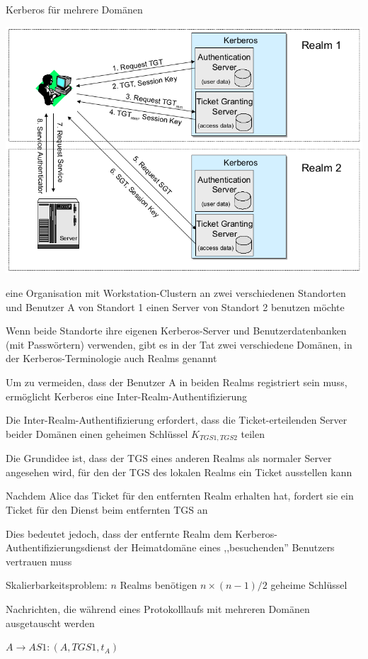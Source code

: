 \documentclass[a4paper]{article}
\begin{document}
\begin{multicols}{3}
      Kerberos für mehrere Domänen
      \begin{center}
            \includegraphics[width=.4\linewidth]{Assets/NetworkSecurity-multi-domain-kerberos.png}
      \end{center}
      \begin{itemize*}
            \item eine Organisation mit Workstation-Clustern an zwei verschiedenen Standorten und Benutzer A von Standort 1 einen Server von Standort 2 benutzen möchte
            \item Wenn beide Standorte ihre eigenen Kerberos-Server und Benutzerdatenbanken (mit Passwörtern) verwenden, gibt es in der Tat zwei verschiedene Domänen, in der Kerberos-Terminologie auch Realms genannt
            \item Um zu vermeiden, dass der Benutzer A in beiden Realms registriert sein muss, ermöglicht Kerberos eine Inter-Realm-Authentifizierung
            \item Die Inter-Realm-Authentifizierung erfordert, dass die Ticket-erteilenden Server beider Domänen einen geheimen Schlüssel $K_{TGS1,TGS2}$ teilen
            \item Die Grundidee ist, dass der TGS eines anderen Realms als normaler Server angesehen wird, für den der TGS des lokalen Realms ein Ticket ausstellen kann
            \item Nachdem Alice das Ticket für den entfernten Realm erhalten hat, fordert sie ein Ticket für den Dienst beim entfernten TGS an
            \item Dies bedeutet jedoch, dass der entfernte Realm dem Kerberos-Authentifizierungsdienst der Heimatdomäne eines ,,besuchenden'' Benutzers vertrauen muss
            \item Skalierbarkeitsproblem: $n$ Realms benötigen $n\times(n-1)/2$ geheime Schlüssel
            \item Nachrichten, die während eines Protokolllaufs mit mehreren Domänen ausgetauscht werden
      \end{itemize*}
      \begin{enumerate*}
            \item $A\rightarrow AS1:(A,TGS1, t_A)$

\end{enumerate*}
\end{multicols}
\end{document}
